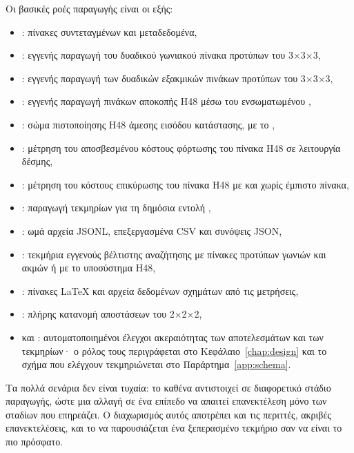 Οι βασικές ροές παραγωγής είναι οι εξής:

\begin{itemize}
\item {}: πίνακες συντεταγμένων και μεταδεδομένα,
\item {}: εγγενής παραγωγή του δυαδικού γωνιακού πίνακα προτύπων του 3×3×3,
\item {}: εγγενής παραγωγή των δυαδικών εξακμικών πινάκων προτύπων του 3×3×3,
\item {}: εγγενής παραγωγή πινάκων αποκοπής H48 μέσω του ενσωματωμένου ,
\item {}: σώμα πιστοποίησης H48 άμεσης εισόδου κατάστασης, με το ,
\item {}: μέτρηση του αποσβεσμένου κόστους φόρτωσης του πίνακα H48 σε λειτουργία δέσμης,
\item {}: μέτρηση του κόστους επικύρωσης του πίνακα H48 με και χωρίς έμπιστο πίνακα,
\item {}: παραγωγή τεκμηρίων για τη δημόσια εντολή ,
\item {}: ωμά αρχεία JSONL, επεξεργασμένα CSV και συνόψεις JSON,
\item {}: τεκμήρια εγγενούς βέλτιστης αναζήτησης με πίνακες προτύπων γωνιών και ακμών ή με το υποσύστημα H48,
\item {}: πίνακες LaTeX και αρχεία δεδομένων σχημάτων από τις μετρήσεις,
\item {}: πλήρης κατανομή αποστάσεων του 2×2×2,
\item {} και : αυτοματοποιημένοι έλεγχοι ακεραιότητας των αποτελεσμάτων και των τεκμηρίων· ο ρόλος τους περιγράφεται στο Κεφάλαιο~\ref{chap:design} και το σχήμα που ελέγχουν τεκμηριώνεται στο Παράρτημα~\ref{app:schema}.
\end{itemize}

Τα πολλά σενάρια δεν είναι τυχαία: το καθένα αντιστοιχεί σε διαφορετικό στάδιο παραγωγής, ώστε μια αλλαγή σε ένα επίπεδο να απαιτεί επανεκτέλεση μόνο των σταδίων που επηρεάζει. Ο διαχωρισμός αυτός αποτρέπει και τις περιττές, ακριβές επανεκτελέσεις, και το να παρουσιάζεται ένα ξεπερασμένο τεκμήριο σαν να είναι το πιο πρόσφατο.

